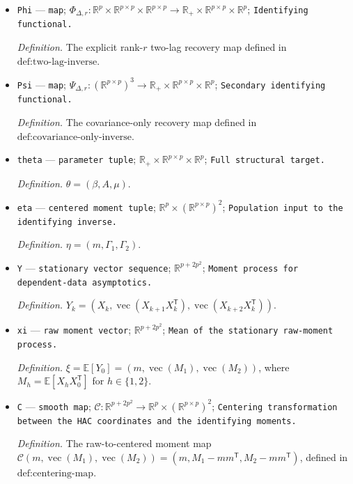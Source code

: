 \documentclass{article}
\begin{document}
\begin{itemize}
  \item \texttt{Phi} --- \texttt{map}; \(\Phi_{\Delta,r}:\mathbb R^p\times\mathbb R^{p\times p}\times\mathbb R^{p\times p}\to\mathbb R_{+}\times\mathbb R^{p\times p}\times\mathbb R^p\); \texttt{Identifying functional.}
  \par\smallskip\noindent\emph{Definition.} The explicit rank-\(r\) two-lag recovery map defined in \(\text{def:two-lag-inverse}\).
  \item \texttt{Psi} --- \texttt{map}; \(\Psi_{\Delta,r}:(\mathbb R^{p\times p})^3\to\mathbb R_{+}\times\mathbb R^{p\times p}\times\mathbb R^p\); \texttt{Secondary identifying functional.}
  \par\smallskip\noindent\emph{Definition.} The covariance-only recovery map defined in \(\text{def:covariance-only-inverse}\).
  \item \texttt{theta} --- \texttt{parameter tuple}; \(\mathbb R_{+}\times\mathbb R^{p\times p}\times\mathbb R^p\); \texttt{Full structural target.}
  \par\smallskip\noindent\emph{Definition.} \(\theta=(\beta,A,\mu)\).
  \item \texttt{eta} --- \texttt{centered moment tuple}; \(\mathbb R^p\times(\mathbb R^{p\times p})^2\); \texttt{Population input to the identifying inverse.}
  \par\smallskip\noindent\emph{Definition.} \(\eta=(m,\Gamma_1,\Gamma_2)\).
  \item \texttt{Y} --- \texttt{stationary vector sequence}; \(\mathbb R^{p+2p^2}\); \texttt{Moment process for dependent-\allowbreak{}data asymptotics.}
  \par\smallskip\noindent\emph{Definition.} \(Y_k=(X_k,\operatorname{vec}(X_{k+1}X_k^{\mathsf T}),\operatorname{vec}(X_{k+2}X_k^{\mathsf T}))\).
  \item \texttt{xi} --- \texttt{raw moment vector}; \(\mathbb R^{p+2p^2}\); \texttt{Mean of the stationary raw-\allowbreak{}moment process.}
  \par\smallskip\noindent\emph{Definition.} \(\xi=\mathbb E[Y_0]=(m,\operatorname{vec}(M_1),\operatorname{vec}(M_2))\), where \(M_h=\mathbb E[X_hX_0^{\mathsf T}]\) for \(h\in\{1,2\}\).
  \item \texttt{C} --- \texttt{smooth map}; \(\mathcal C:\mathbb R^{p+2p^2}\to\mathbb R^p\times(\mathbb R^{p\times p})^2\); \texttt{Centering transformation between the HAC coordinates and the identifying moments.}
  \par\smallskip\noindent\emph{Definition.} The raw-to-centered moment map \(\mathcal C(m,\operatorname{vec}(M_1),\operatorname{vec}(M_2))=(m,M_1-mm^{\mathsf T},M_2-mm^{\mathsf T})\), defined in \(\text{def:centering-map}\).

\end{itemize}
\end{document}
